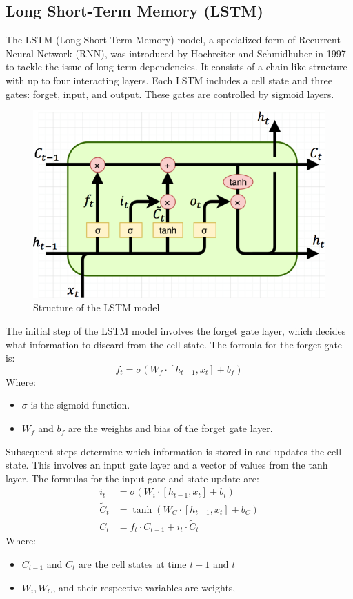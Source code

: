 \documentclass{ieeeojies}
\begin{document}
\subsection{Long Short-Term Memory (LSTM)} 
The LSTM (Long Short-Term Memory) model, a specialized form of Recurrent Neural Network (RNN), was introduced by Hochreiter and Schmidhuber in 1997 to tackle the issue of long-term dependencies. It consists of a chain-like structure with up to four interacting layers. Each LSTM includes a cell state and three gates: forget, input, and output. These gates are controlled by sigmoid layers.\cite{zargar2021introduction}
\begin{figure}[H]
  \centering
  \begin{minipage}{0.8\linewidth}
    \centering
    \includegraphics[width=\linewidth]{Figure_algorithm/lstm (1).png}
    \caption{Structure of the LSTM model \cite{lstm_fig}}
  \end{minipage}
\end{figure}
The initial step of the LSTM model involves the forget gate layer, which decides what information to discard from the cell state. The formula for the forget gate is:
\[ f_t = \sigma(W_f \cdot [h_{t-1}, x_t] + b_f) \]
Where:
\begin{itemize}
    \item \( \sigma \) is the sigmoid function.
    \item \( W_f \) and \( b_f \) are the weights and bias of the forget gate layer.
\end{itemize}

Subsequent steps determine which information is stored in and updates the cell state. This involves an input gate layer and a vector of values from the tanh layer. The formulas for the input gate and state update are:
\begin{align*}
    i_t & = \sigma(W_i \cdot [h_{t-1}, x_t] + b_i) \\
    \tilde{C}_t & = \tanh(W_C \cdot [h_{t-1}, x_t] + b_C) \\
    C_t & = f_t \cdot C_{t-1} + i_t \cdot \tilde{C}_t
\end{align*}
Where:
\begin{itemize}
    \item \( C_{t-1} \) and \( C_t \) are the cell states at time \( t-1 \) and \( t \)
    \item \( W_i, W_C \), and their respective variables are weights,
\end{itemize}
\end{document}
